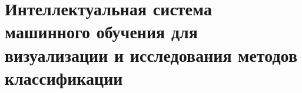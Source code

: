 \chapter{Интеллектуальная система машинного обучения для визуализации и исследования методов классификации}








